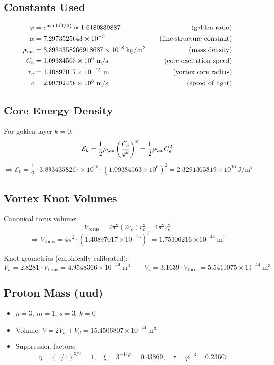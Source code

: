 \documentclass[11pt]{article}
\begin{document}
    \subsection*{Constants Used}
    \begin{align*}
        \varphi &= e^{\operatorname{asinh}(1/2)} \approx 1.6180339887 \quad &\text{(golden ratio)} \\
        \alpha &= 7.2973525643 \times 10^{-3} \quad &\text{(fine-structure constant)} \\
        \rho_{\ae} &= 3.8934358266918687 \times 10^{18}~\mathrm{kg/m^3} \quad &\text{(mass density)} \\
        C_e &= 1.09384563 \times 10^6~\mathrm{m/s} \quad &\text{(core excitation speed)} \\
        r_c &= 1.40897017 \times 10^{-15}~\mathrm{m} \quad &\text{(vortex core radius)} \\
        c &= 2.99792458 \times 10^8~\mathrm{m/s} \quad &\text{(speed of light)} \\
    \end{align*}

    \subsection*{Core Energy Density}
    For golden layer \(k = 0\):
    \[
        \mathcal{E}_k = \frac{1}{2} \rho_{\ae} \left( \frac{C_e}{\varphi^k} \right)^2 = \frac{1}{2} \rho_{\ae} C_e^2
    \]
    \[
        \Rightarrow \mathcal{E}_0 = \frac{1}{2} \cdot 3.8934358267 \times 10^{18} \cdot (1.09384563 \times 10^6)^2 = 2.3291363819 \times 10^{30}~\mathrm{J/m^3}
    \]

    \subsection*{Vortex Knot Volumes}
    Canonical torus volume:
    \[
        V_{\text{torus}} = 2\pi^2 (2r_c) r_c^2 = 4\pi^2 r_c^3
    \]
    \[
        \Rightarrow V_{\text{torus}} = 4\pi^2 \cdot (1.40897017 \times 10^{-15})^3 = 1.75106216 \times 10^{-44}~\mathrm{m^3}
    \]

    Knot geometries (empirically calibrated):
    \[
        V_u = 2.8281 \cdot V_{\text{torus}} = 4.9548366 \times 10^{-44}~\mathrm{m^3}
        \qquad
        V_d = 3.1639 \cdot V_{\text{torus}} = 5.5410075 \times 10^{-44}~\mathrm{m^3}
    \]

    \subsection*{Proton Mass (uud)}
    \begin{itemize}
        \item \(n = 3\), \(m = 1\), \(s = 3\), \(k = 0\)
        \item Volume: \(V = 2V_u + V_d = 15.4506807 \times 10^{-44}~\mathrm{m^3}\)
        \item Suppression factors:
        \[
            \eta = (1/1)^{3/2} = 1, \quad
            \xi = 3^{-1/\varphi} = 0.43869, \quad
            \tau = \varphi^{-3} = 0.23607
        \]
    \end{itemize}
\end{document}
